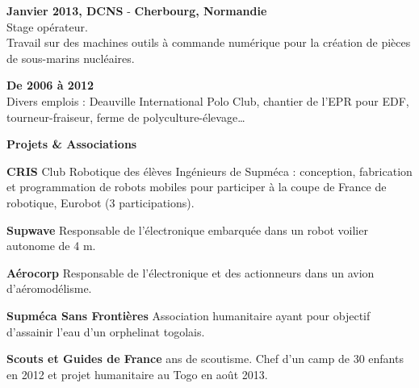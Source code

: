 \documentclass[a4paper,11pt,final]{memoir}
\newcommand{\Sep}{\vspace{1.5em}}
\newcommand{\SmallSep}{\vspace{0.5em}}
\newcommand{\CVSection}[1]
	{\Large\textbf{#1}\par
	\SmallSep\normalsize\normalfont}
\newcommand{\CVItem}[1]
	{\textbf{\color{RoyalBlue} #1}\normalsize\normalfont}
\newcommand{\city}[1]
	{{\small\textbf{#1}}\normalsize\normalfont}
\begin{document}
\CVItem{Janvier 2013, DCNS} - \city{Cherbourg, Normandie}\\
Stage opérateur.\\
Travail sur des machines outils à commande numérique pour la création de pièces de sous-marins nucléaires.
\SmallSep

\CVItem{De 2006 à 2012}\\
Divers emplois : Deauville International Polo Club, chantier de l'EPR pour EDF, tourneur-fraiseur, ferme de polyculture-élevage\ldots
\Sep

\CVSection{Projets \& Associations}
\CVItem{CRIS}
Club Robotique des élèves Ingénieurs de Supméca : conception, fabrication et programmation de robots mobiles pour participer à la coupe de France de robotique, Eurobot (3 participations).

\CVItem{Supwave}
Responsable de l'électronique embarquée dans un robot voilier autonome de 4 m.

\CVItem{Aérocorp}
Responsable de l'électronique et des actionneurs dans un avion d'aéromodélisme.

\CVItem{Supméca Sans Frontières}
Association humanitaire ayant pour objectif d'assainir l'eau d'un orphelinat togolais.

\CVItem{Scouts et Guides de France}
8 ans de scoutisme. Chef d'un camp de 30 enfants en 2012 et projet humanitaire au Togo en août 2013.

\end{document}
